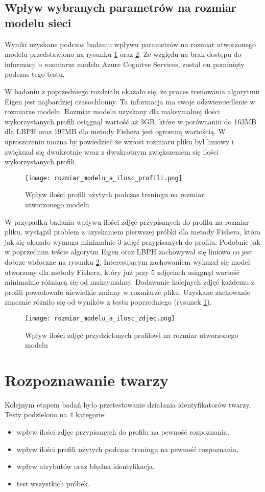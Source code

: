 \subsection{Wpływ wybranych parametrów na rozmiar modelu sieci}
Wyniki uzyskane podczas badaniu wpływu parametrów na rozmiar utworzonego modelu przedstawiono na rysunku \ref{fig:rozmiar_profile} oraz \ref{fig:rozmiar_zdjecia}. Ze względu na brak dostępu do informacji o rozmiarze modelu Azure Cognitve Services, został on pominięty podczas tego testu.

W badaniu z poprzedniego rozdziału okazało się, że proces trenowania algorytmu Eigen jest najbardziej czasochłonny. Ta informacja ma swoje odzwierciedlenie w rozmiarze modelu. Rozmiar modelu uzyskany dla maksymalnej ilości wykorzystanych profili osiągnął wartość aż 3GB, które w porównaniu do 163MB dla LBPH oraz 197MB dla metody Fishera jest ogromną wartością. W uproszczeniu można by powiedzieć że wzrost rozmiaru pliku był liniowy i zwiększał się dwukrotnie wraz z dwukrotnym zwiększeniem się ilości wykorzystanych profili. 
\begin{figure}[H]
	\centering
	\texttt{[image: rozmiar\_modelu\_a\_ilosc\_profili.png]}
	\caption{Wpływ ilości profili użytych podczas treningu na rozmiar utworzonego modelu}
	\label{fig:rozmiar_profile}
\end{figure}
W przypadku badania wpływu ilości zdjęć przypisanych do profilu na rozmiar pliku, wystąpił problem z uzyskaniem pierwszej próbki dla metody Fishera, która jak się okazało wymaga minimalnie 3 zdjęć przypisanych do profilu. Podobnie jak w poprzednim teście algorytm Eigen oraz LBPH zachowywał się liniowo co jest dobrze widoczne na rysunku \ref{fig:rozmiar_zdjecia}. Interesującym zachowaniem wykazał się model utworzony dla metody Fishera, który już przy 5 zdjęciach osiągnął wartość minimalnie różniącą się od maksymalnej. Dodawanie kolejnych zdjęć każdemu z profili powodowało niewielkie zmiany w rozmiarze pliku. Uzyskane zachowanie znacznie różniło się od wyników z testu poprzedniego (rysunek \ref{fig:rozmiar_profile}).
\begin{figure}[H]
	\centering
	\texttt{[image: rozmiar\_modelu\_a\_ilosc\_zdjec.png]}
	\caption{Wpływ ilości zdjęć przydzielonych profilowi na rozmiar utworzonego modelu}
	\label{fig:rozmiar_zdjecia}
\end{figure}

\section{Rozpoznawanie twarzy} \label{b:rozpoznawanie}
Kolejnym etapem badań było przetestowanie działania identyfikatorów twarzy, Testy podzielono na 4 kategorie:
\begin{itemize}
\item wpływ ilości zdjęc przypisanych do profilu na pewność rozpoznania,
\item wpływ ilości profili użytych podczas treningu na pewność rozpoznania,
\item wpływ atrybutów oraz błędna identyfikacja,
\item test wszystkich próbek.
\end{itemize}
